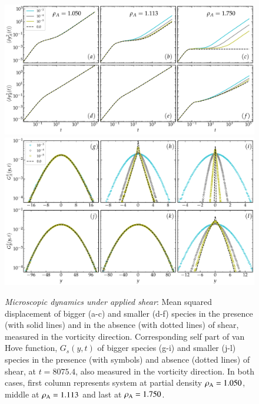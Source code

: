 %
\begin{figure}[htb!]
\centering
\includegraphics[width=15cm]{figs/fig7p6af.pdf}
\includegraphics[width=15cm]{figs/fig7p6gl.pdf}
\caption[{\em Microscopic dynamics under applied shear: mean squared displacement and self part of van Hove function}]{{\em Microscopic dynamics under applied shear}: Mean squared displacement of bigger (a-c) and smaller (d-f) species in the presence (with solid lines) and in the absence (with dotted lines) of shear, measured in the vorticity direction. Corresponding self part of van Hove function, $G_s(y,t)$ of bigger species (g-i) and smaller (j-l) species in the presence (with symbols) and absence (dotted lines) of shear, at $t=8075.4$, also measured in the vorticity direction. In both cases, first column represents system at partial density $\rho_{\rm A} = 1.050$, middle at $\rho_{\rm A} = 1.113$ and last at $\rho_{\rm A} = 1.750$. 
\label{fig6}}
\end{figure}
%

%
